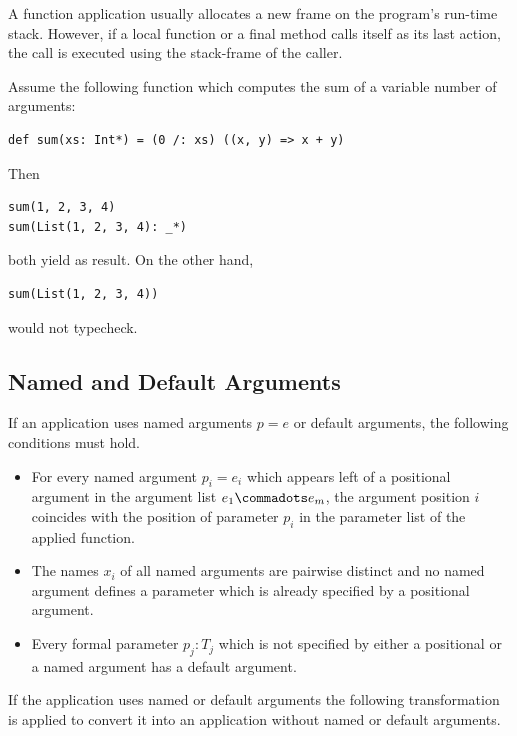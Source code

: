 A function application usually allocates a new frame on the program's
run-time stack. However, if a local function or a final method calls
itself as its last action, the call is executed using the stack-frame
of the caller.

\example Assume the following function which computes the sum of a
variable number of arguments:
\begin{lstlisting}
def sum(xs: Int*) = (0 /: xs) ((x, y) => x + y)
\end{lstlisting}
Then
\begin{lstlisting}
sum(1, 2, 3, 4)
sum(List(1, 2, 3, 4): _*)
\end{lstlisting}
both yield  as result. On the other hand, 
\begin{lstlisting}
sum(List(1, 2, 3, 4))
\end{lstlisting}
would not typecheck.

\subsection{Named and Default Arguments}
\label{sec:named-default}

If an application uses named arguments $p = e$ or default arguments,
the following conditions must hold.
\begin{itemize}
\item For every named argument $p_i = e_i$ which appears left of a positional argument
in the argument list $e_1 \commadots e_m$, the argument position $i$ coincides with
the position of parameter $p_i$ in the parameter list of the applied function.
\item The names $x_i$ of all named arguments are pairwise distinct and no named
  argument defines a parameter which is already specified by a
  positional argument.
\item Every formal parameter $p_j:T_j$ which is not specified by either a positional
  or a named argument has a default argument.
\end{itemize}

If the application uses named or default
arguments the following transformation is applied to convert it into
an application without named or default arguments. 

